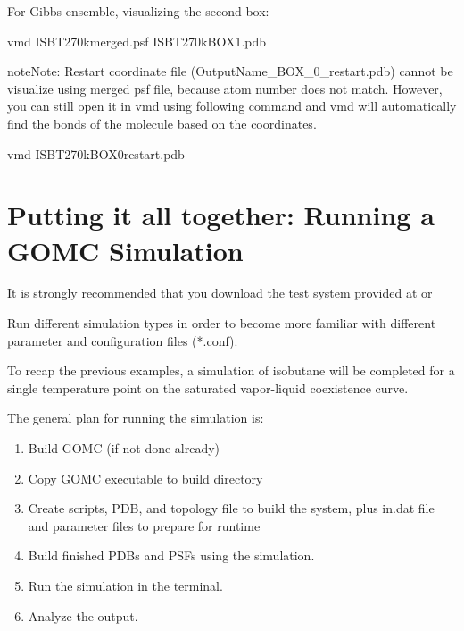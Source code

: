 \documentclass[letterpaper,10pt,english]{sphinxmanual}
\begin{document}
For Gibbs ensemble, visualizing the second box:

%
\begin{sphinxVerbatim}[commandchars=\\\{\}]
\PYGZdl{} vmd ISB\PYGZus{}T\PYGZus{}270\PYGZus{}k\PYGZus{}merged.psf ISB\PYGZus{}T\PYGZus{}270\PYGZus{}k\PYGZus{}BOX\PYGZus{}1.pdb
\end{sphinxVerbatim}

\begin{sphinxadmonition}{note}{Note:}
Restart coordinate file (OutputName\_BOX\_0\_restart.pdb) cannot be visualize using merged psf file, because atom number does not match. However, you can still open it in vmd using following command and vmd will automatically find the bonds of the molecule based on the coordinates.
\end{sphinxadmonition}

%
\begin{sphinxVerbatim}[commandchars=\\\{\}]
\PYGZdl{} vmd ISB\PYGZus{}T\PYGZus{}270\PYGZus{}k\PYGZus{}BOX\PYGZus{}0\PYGZus{}restart.pdb
\end{sphinxVerbatim}


\chapter{Putting it all together: Running a GOMC Simulation}
\label{\detokenize{putting_all_together:putting-it-all-together-running-a-gomc-simulation}}\label{\detokenize{putting_all_together::doc}}
It is strongly recommended that you download the test system provided at  or 

Run different simulation types in order to become more familiar with different parameter and configuration files (*.conf).

To recap the previous examples, a simulation of isobutane will be completed for a single temperature point on the saturated vapor-liquid coexistence curve.

The general plan for running the simulation is:
\begin{enumerate}
\item {} 
Build GOMC (if not done already)

\item {} 
Copy GOMC executable to build directory

\item {} 
Create scripts, PDB, and topology file to build the system, plus in.dat file and parameter files to prepare for runtime

\item {} 
Build finished PDBs and PSFs using the simulation.

\item {} 
Run the simulation in the terminal.

\item {} 
Analyze the output.

\end{enumerate}
\end{document}
